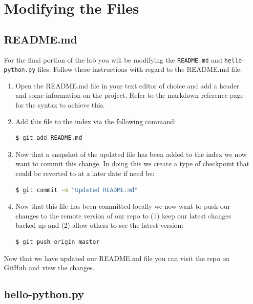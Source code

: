 \documentclass[a4paper,10pt]{article} %
\begin{document}
\section{Modifying the Files}

\subsection{README.md}

For the final portion of the lab you will be modifying the \lstinline|README.md| and \lstinline|hello-python.py| files. Follow these instructions with regard to the README.md file:
\begin{enumerate}
  \item Open the README.md file in your text editor of choice and add a header and some information on the project. Refer to the markdown reference page for the syntax to achieve this.
  \item Add this file to the index via the following command:
\begin{lstlisting}[language=bash]
$ git add README.md
\end{lstlisting}
  \item Now that a snapshot of the updated file has been added to the index we now want to commit this change. In doing this we create a type of checkpoint that could be reverted to at a later date if need be:
\begin{lstlisting}[language=bash]
$ git commit -m "Updated README.md"
\end{lstlisting}
\item Now that this file has been committed locally we now want to push our changes to the remote version of our repo to (1) keep our latest changes backed up and (2) allow others to see the latest version:
\begin{lstlisting}[language=bash]
$ git push origin master
\end{lstlisting}
\end{enumerate}

Now that we have updated our README.md file you can visit the repo on GitHub and view the changes.

\subsection{hello-python.py}
\end{document}
